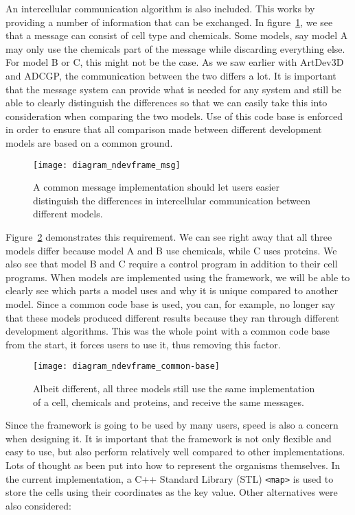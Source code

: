 An intercellular communication algorithm is also included. This works by providing a number of information that can be exchanged. In figure~\ref{fig:diagram_ndevframe_msg}, we see that a message can consist of cell type and chemicals. Some models, say model A may only use the chemicals part of the message while discarding everything else. For model B or C, this might not be the case. As we saw earlier with ArtDev3D and ADCGP, the communication between the two differs a lot. It is important that the message system can provide what is needed for any system and still be able to clearly distinguish the differences so that we can easily take this into consideration when comparing the two models. Use of this code base is enforced in order to ensure that all comparison made between different development models are based on a common ground.

\begin{figure}[!ht]
	\centering
	\texttt{[image: diagram\_ndevframe\_msg]}
	\caption{A common message implementation should let users easier distinguish the differences in intercellular communication between different models.}
	\label{fig:diagram_ndevframe_msg}
\end{figure}

Figure~\ref{fig:diagram_ndevframe_common-base} demonstrates this requirement. We can see right away that all three models differ because model A and B use chemicals, while C uses proteins. We also see that model B and C require a control program in addition to their cell programs. When models are implemented using the framework, we will be able to clearly see which parts a model uses and why it is unique compared to another model. Since a common code base is used, you can, for example, no longer say that these models produced different results because they ran through different development algorithms. This was the whole point with a common code base from the start, it forces users to use it, thus removing this factor.

\begin{figure}[!ht]
	\centering
	\texttt{[image: diagram\_ndevframe\_common-base]}
	\caption{Albeit different, all three models still use the same implementation of a cell, chemicals and proteins, and receive the same messages.}
	\label{fig:diagram_ndevframe_common-base}
\end{figure}

Since the framework is going to be used by many users, speed is also a concern when designing it. It is important that the framework is not only flexible and easy to use, but also perform relatively well compared to other implementations. Lots of thought as been put into how to represent the organisms themselves. In the current implementation, a C++ Standard Library (STL) \texttt{<map>} is used to store the cells using their coordinates as the key value. Other alternatives were also considered:

